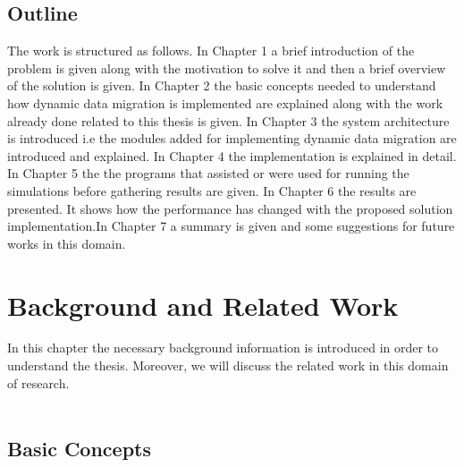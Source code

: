 \documentclass{listhesis}
\begin{document}
\section{Outline}
The work is structured as follows. In Chapter 1 a brief introduction of the problem is given along with the motivation to solve it and then a brief overview of the solution is given.
In Chapter 2 the basic concepts needed to understand how dynamic data migration is implemented are explained along with the work already done related to this thesis is given. In Chapter 3 the system architecture is introduced i.e the modules added for implementing dynamic data migration are introduced and explained. In Chapter 4 the implementation is explained in detail. In Chapter 5 the the programs that assisted or were used for running the simulations before gathering results are given. In Chapter 6 the results are presented. It shows how the performance has changed with the proposed solution implementation.In Chapter 7 a summary is given and some suggestions for future works in this domain. 
\chapter{Background and Related Work}
In this chapter the necessary background information is introduced in order to understand the thesis. Moreover, we will discuss the related work in this domain of research.\\
\\
\section{Basic Concepts}
\end{document}

